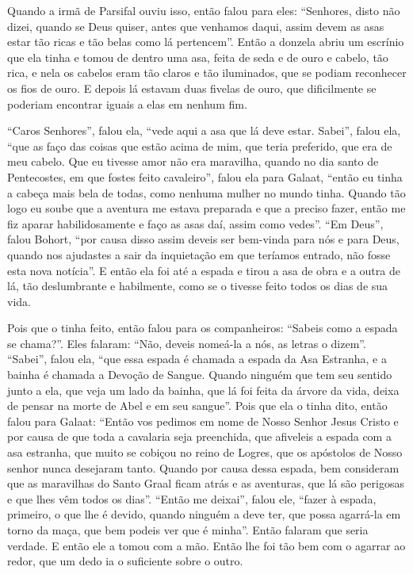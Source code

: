 Quando a irmã de Parsifal ouviu isso, então falou para eles: “Senhores, disto
não dizei, quando se Deus quiser, antes que venhamos daqui, assim devem as asas
estar tão ricas e tão belas como lá pertencem”. Então a donzela abriu um
escrínio que ela tinha e tomou de dentro uma asa, feita de seda e de ouro e
cabelo, tão rica, e nela os cabelos eram tão claros e tão iluminados, que se
podiam reconhecer os fios de ouro. E depois lá estavam duas fivelas de ouro,
que dificilmente se poderiam encontrar iguais a elas em nenhum fim.

“Caros Senhores”, falou ela, “vede aqui a asa que lá deve estar. Sabei”, falou
ela, “que as faço das coisas que estão acima de mim, que teria preferido, que
era de meu cabelo. Que eu tivesse amor não era maravilha, quando no dia santo
de Pentecostes, em que fostes feito cavaleiro”, falou ela para Galaat, “então
eu tinha a cabeça mais bela de todas, como nenhuma mulher no mundo tinha.
Quando tão logo eu soube que a aventura me estava preparada e que a preciso
fazer, então me fiz aparar habilidosamente e faço as asas daí, assim como
vedes”. “Em Deus”, falou Bohort, “por causa disso assim deveis ser bem-vinda
para nós e para Deus, quando nos ajudastes a sair da inquietação em que
teríamos entrado, não fosse esta nova notícia”. E então ela foi até a espada e
tirou a asa de obra e a outra de lá, tão deslumbrante e habilmente, como se o
tivesse feito todos os dias de sua vida.

Pois que o tinha feito, então falou para os companheiros: “Sabeis como a espada
se chama?”. Eles falaram: “Não, deveis nomeá-la a nós, as letras o dizem”.
“Sabei”, falou ela, “que essa espada é chamada a espada da Asa Estranha, e a
bainha é chamada a Devoção de Sangue. Quando ninguém que tem seu sentido junto
a ela, que veja um lado da bainha, que lá foi feita da árvore da vida, deixa de
pensar na morte de Abel e em seu sangue”. Pois que ela o tinha dito, então
falou para Galaat: “Então vos pedimos em nome de Nosso Senhor Jesus Cristo e
por causa de que toda a cavalaria seja preenchida, que afiveleis a espada com a
asa estranha, que muito se cobiçou no reino de Logres, que os apóstolos de
Nosso senhor nunca desejaram tanto. Quando por causa dessa espada, bem
consideram que as maravilhas do Santo Graal ficam atrás e as aventuras, que lá
são perigosas e que lhes vêm todos os dias”. “Então me deixai”, falou
ele, “fazer à espada, primeiro, o que lhe é devido, quando ninguém a deve ter,
que possa agarrá-la em torno da maça, que bem podeis ver que é minha”. Então
falaram que seria verdade. E então ele a tomou com a mão. Então lhe foi tão bem
com o agarrar ao redor, que um dedo ia o suficiente sobre o outro.

